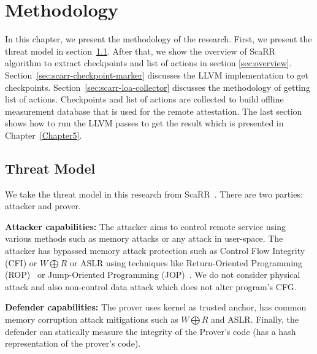 
\chapter{Methodology} %

\label{Chapter4} %

In this chapter, we present the methodology of the research. First, we present
the threat model in section~\ref{sec:threat-model}.  After that, we show the
overview of ScaRR algorithm to extract checkpoints and list of actions in
section \ref{sec:overview}. Section~\ref{sec:scarr-checkpoint-marker} discusses
the LLVM implementation to get checkpoints.
Section~\ref{sec:scarr-loa-collector} discusses the methodology of getting list
of actions.  Checkpoints and list of actions are collected to build offline
measurement database that is used for the remote attestation. The last section
shows how to run the LLVM passes to get the result which is presented in
Chapter~\ref{Chapter5}.

\section{Threat Model}
\label{sec:threat-model}

We take the threat model in this research from
ScaRR~\cite{toffaliniScaRRScalableRuntime2019}. There are two parties: attacker
and prover. 

\vspace{0.5cm}
\noindent \textbf{Attacker capabilities:} The attacker aims to control remote
service using various methods such as memory attacks or any attack in
user-space. The attacker has bypassed memory attack protection such as Control
Flow Integrity (CFI) or \( W \bigoplus R \) or ASLR using techniques like
Return-Oriented Programming
(ROP)~\cite{roemerReturnorientedProgrammingSystems2012} or Jump-Oriented
Programming (JOP)~\cite{bletschJumpOrientedProgrammingNew2011}. We do not
consider physical attack and also non-control data attack which does not alter
program's CFG.

\vspace{0.5cm}
\noindent \textbf{Defender capabilities:} The prover uses kernel as trusted
anchor, has common memory corruption attack mitigations such as \( W \bigoplus R
\) and ASLR. Finally, the defender can statically measure the integrity of the
Prover's code (\ie has a hash representation of the prover's code).


